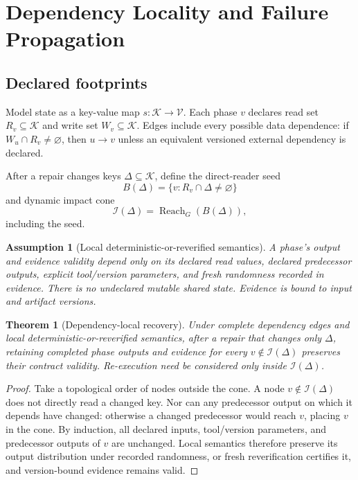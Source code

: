 \documentclass[11pt]{article}
\newtheorem{assumption}[definition]{Assumption}
\newtheorem{theorem}[definition]{Theorem}
\newcommand{\Keys}{\mathcal K}
\newcommand{\Reach}{\operatorname{Reach}}
\begin{document}
\section{Dependency Locality and Failure Propagation}
\subsection{Declared footprints}
Model state as a key-value map $s:\Keys\to\mathcal V$. Each phase $v$ declares read set $R_v\subseteq\Keys$ and write set $W_v\subseteq\Keys$. Edges include every possible data dependence: if $W_u\cap R_v\neq\varnothing$, then $u\to v$ unless an equivalent versioned external dependency is declared.

After a repair changes keys $\Delta\subseteq\Keys$, define the direct-reader seed
\[
B(\Delta)=\{v:R_v\cap\Delta\neq\varnothing\}
\]
and dynamic impact cone
\[
\mathcal I(\Delta)=\Reach_G(B(\Delta)),
\]
including the seed.

\begin{assumption}[Local deterministic-or-reverified semantics]
A phase's output and evidence validity depend only on its declared read values, declared predecessor outputs, explicit tool/version parameters, and fresh randomness recorded in evidence. There is no undeclared mutable shared state. Evidence is bound to input and artifact versions.
\end{assumption}

\begin{theorem}[Dependency-local recovery]
\label{thm:local}
Under complete dependency edges and local deterministic-or-reverified semantics, after a repair that changes only $\Delta$, retaining completed phase outputs and evidence for every $v\notin\mathcal I(\Delta)$ preserves their contract validity. Re-execution need be considered only inside $\mathcal I(\Delta)$.
\end{theorem}
\begin{proof}
Take a topological order of nodes outside the cone. A node $v\notin\mathcal I(\Delta)$ does not directly read a changed key. Nor can any predecessor output on which it depends have changed: otherwise a changed predecessor would reach $v$, placing $v$ in the cone. By induction, all declared inputs, tool/version parameters, and predecessor outputs of $v$ are unchanged. Local semantics therefore preserve its output distribution under recorded randomness, or fresh reverification certifies it, and version-bound evidence remains valid.
\end{proof}
\end{document}
